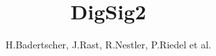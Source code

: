 \documentclass{scrartcl}
\title{DigSig2}
\author{H.Badertscher, J.Rast, R.Nestler, P.Riedel et al.}
\begin{document}
\setcounter{tocdepth}{2}

\maketitle
\newpage

\tableofcontents
\newpage


\begin{multicols}{2}

\newpage

\newpage

\end{multicols}




\newpage

\end{document}

